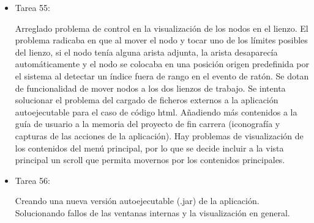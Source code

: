 \begin{itemize}
\item Tarea 55:

Arreglado problema de control en la visualización de los nodos en el lienzo. El problema radicaba en que al mover el nodo y tocar uno de los límites posibles del lienzo, si el nodo tenía alguna arista adjunta, la arista desaparecía automáticamente y el nodo se colocaba en una posición origen predefinida por el sistema al detectar un índice fuera de rango en el evento de ratón. Se dotan de funcionalidad de mover nodos a los dos lienzos de trabajo. Se intenta solucionar el problema del cargado de ficheros externos a la aplicación autoejecutable para el caso de código html. Añadiendo más contenidos a la guía de usuario a la memoria del proyecto de fin carrera (iconografía y capturas de las acciones de la aplicación). Hay problemas de visualización de los contenidos del menú principal, por lo que se decide incluir a la vista principal un scroll que permita movernos por los contenidos principales.\\
\newpage

\item Tarea 56:

Creando una nueva versión autoejecutable (.jar) de la aplicación. Solucionando fallos de las ventanas internas y la visualización en general.


\end{itemize}
